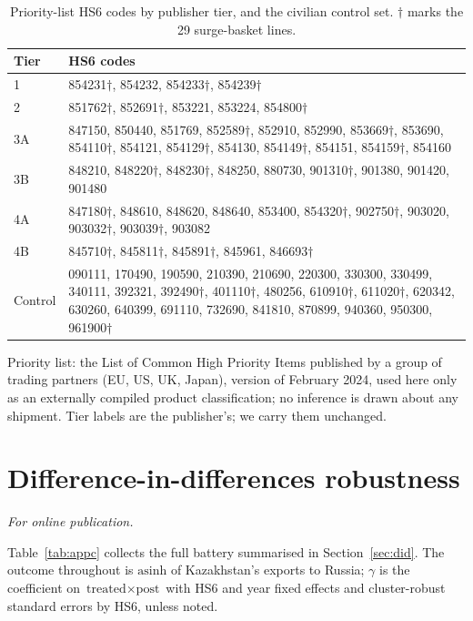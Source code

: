 \documentclass[12pt]{article}
\begin{document}
\begin{table}[htbp]
\centering
\caption{Priority-list HS6 codes by publisher tier, and the civilian control set.
$\dagger$ marks the 29 surge-basket lines.}
\label{tab:appb}
\footnotesize
\begin{tabular}{@{}p{1.6cm}p{12.4cm}@{}}
\toprule
Tier & HS6 codes \\
\midrule
1 & 854231$\dagger$, 854232, 854233$\dagger$, 854239$\dagger$ \\
2 & 851762$\dagger$, 852691$\dagger$, 853221, 853224, 854800$\dagger$ \\
3A & 847150, 850440, 851769, 852589$\dagger$, 852910, 852990, 853669$\dagger$, 853690, 854110$\dagger$, 854121, 854129$\dagger$, 854130, 854149$\dagger$, 854151, 854159$\dagger$, 854160 \\
3B & 848210, 848220$\dagger$, 848230$\dagger$, 848250, 880730, 901310$\dagger$, 901380, 901420, 901480 \\
4A & 847180$\dagger$, 848610, 848620, 848640, 853400, 854320$\dagger$, 902750$\dagger$, 903020, 903032$\dagger$, 903039$\dagger$, 903082 \\
4B & 845710$\dagger$, 845811$\dagger$, 845891$\dagger$, 845961, 846693$\dagger$ \\
\midrule
Control & 090111, 170490, 190590, 210390, 210690, 220300, 330300, 330499, 340111, 392321, 392490$\dagger$, 401110$\dagger$, 480256, 610910$\dagger$, 611020$\dagger$, 620342, 630260, 640399, 691110, 732690, 841810, 870899, 940360, 950300, 961900$\dagger$ \\
\bottomrule
\end{tabular}

\vspace{2pt}
\footnotesize Priority list: the List of Common High Priority Items published by a group of trading partners (EU, US, UK, Japan), version of February 2024, used here only as an externally compiled product classification; no inference is drawn about any shipment. Tier labels are the publisher's; we carry them unchanged.
\end{table}

\section{Difference-in-differences robustness}\label{app:did}
\emph{For online publication.}

\medskip
Table~\ref{tab:appc} collects the full battery summarised in Section~\ref{sec:did}. The outcome
throughout is $\text{asinh}$ of Kazakhstan's exports to Russia; $\gamma$ is the coefficient on
$\text{treated}\times\text{post}$ with HS6 and year fixed effects and cluster-robust standard
errors by HS6, unless noted.
\end{document}
